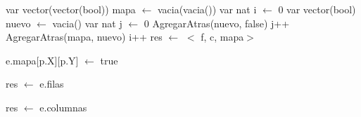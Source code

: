 \disAlgoritmos
\begin{algorithm}[H]
\begin{algorithmic}[1]
 
  \State var vector(vector(bool)) mapa $\gets$ vacia(vacia()) 
  \State var nat i $\gets$ 0 
   
    \State var vector(bool) nuevo $\gets$ vacia() 
    \State var nat j $\gets$ 0 
     
      \State AgregarAtras(nuevo, false) 
      \State j++  
    \EndWhile
    \State AgregarAtras(mapa, nuevo) 
    \State i++ 
  \EndWhile
  \State res $\gets$ $<$ f, c, mapa$>$ 
  
\EndFunction
\end{algorithmic}
\end{algorithm}

\begin{algorithm}[H]
\begin{algorithmic}[1]
 
  \State e.mapa[p.X][p.Y] $\gets$ true 
\EndFunction
\end{algorithmic}
\end{algorithm}

\begin{algorithm}[H]
\begin{algorithmic}[1]
 
  \State res $\gets$ e.filas  
\EndFunction
\end{algorithmic}
\end{algorithm}

\begin{algorithm}[H]
\begin{algorithmic}[1]
 
  \State res $\gets$ e.columnas  
\EndFunction
\end{algorithmic}
\end{algorithm}

